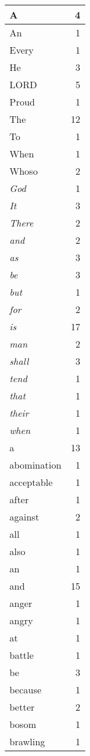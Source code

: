 \begin{center}
\begin{longtable}{l|r}
A & 4\\ \hline 
An & 1\\ \hline 
Every & 1\\ \hline 
He & 3\\ \hline 
LORD & 5\\ \hline 
Proud & 1\\ \hline 
The & 12\\ \hline 
To & 1\\ \hline 
When & 1\\ \hline 
Whoso & 2\\ \hline 
\emph{God} & 1\\ \hline 
\emph{It} & 3\\ \hline 
\emph{There} & 2\\ \hline 
\emph{and} & 2\\ \hline 
\emph{as} & 3\\ \hline 
\emph{be} & 3\\ \hline 
\emph{but} & 1\\ \hline 
\emph{for} & 2\\ \hline 
\emph{is} & 17\\ \hline 
\emph{man} & 2\\ \hline 
\emph{shall} & 3\\ \hline 
\emph{tend} & 1\\ \hline 
\emph{that} & 1\\ \hline 
\emph{their} & 1\\ \hline 
\emph{when} & 1\\ \hline 
a & 13\\ \hline 
abomination & 1\\ \hline 
acceptable & 1\\ \hline 
after & 1\\ \hline 
against & 2\\ \hline 
all & 1\\ \hline 
also & 1\\ \hline 
an & 1\\ \hline 
and & 15\\ \hline 
anger & 1\\ \hline 
angry & 1\\ \hline 
at & 1\\ \hline 
battle & 1\\ \hline 
be & 3\\ \hline 
because & 1\\ \hline 
better & 2\\ \hline 
bosom & 1\\ \hline 
brawling & 1\\ \hline 

\end{longtable}
\end{center}
